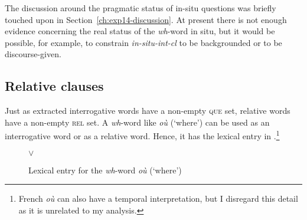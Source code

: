 The discussion around the pragmatic status of in-situ questions was briefly touched upon in Section~\ref{ch:exp14-discussion}. At present there is not enough evidence concerning the real status of the \emph{wh}-word in situ, but it would be possible, for example, to constrain \textit{in-situ-int-cl} to be backgrounded or to be discourse-given. 

\subsection{Relative clauses}\largerpage[2]

Just as extracted interrogative words have a non-empty \textsc{que} set, relative words have a non-empty \textsc{rel} set. A \emph{wh}-word like \emph{où} (`where') can be used as an interrogative word or as a relative word. Hence, it has the lexical entry in .\footnote{French \emph{où} can also have a temporal interpretation, but I disregard this detail as it is unrelated to my analysis.}

\begin{figure}[h]
\small
{} $ \vee$ 
\caption{Lexical entry for the \emph{wh}-word \emph{où} (`where')}\label{ex:avm-ou}
\end{figure}

